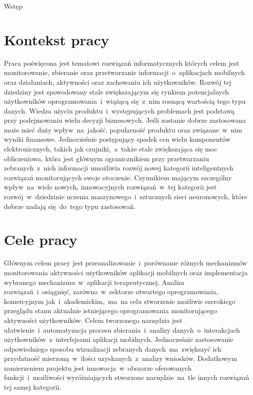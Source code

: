 \begin{chapter}{Wstęp}
	\newcommand{\chapterPath}{chapters/Introduction}

	\section{Kontekst pracy}
	Praca poświęcona jest tematowi rozwiązań informatycznych których celem jest monitorowanie, zbieranie oraz przetwarzanie informacji~o~aplikacjach mobilnych oraz działaniach, aktywności oraz zachowaniu ich użytkowników. Rozwój tej dziedziny jest spowodowany stale zwiększającym się rynkiem potencjalnych użytkowników oprogramowania~i~wiążącą się~z~nim rosnącą wartością tego typu danych. Wiedza użyciu produktu~i~występujących problemach jest podstawą przy podejmowaniu wielu decyzji biznesowych. Jeśli zostanie dobrze zastosowana może mieć duży wpływ~na~jakość, popularność produktu oraz związane~w~nim wyniki finansowe. Jednocześnie postępujący spadek cen wielu komponentów elektronicznych, takich jak czujniki,~a~także stale zwiększająca się moc obliczeniowa, która jest głównym ogranicznikiem  przy przetwarzaniu zebranych~z~nich informacji umożliwia rozwój nowej kategorii inteligentnych rozwiązań monitorujących swoje otoczenie. Czynnikiem mającym szczególny wpływ~na~wiele nowych, innowacyjnych rozwiązań~w~tej kategorii jest rozwój~w~dziedzinie uczenia maszynowego~i~sztucznych sieci neuronowych, które dobrze nadają się~do~tego typu zastosowań.
	
	\section{Cele pracy}
	Głównym celem pracy jest przeanalizowanie~i~porównanie różnych mechanizmów monitorowania aktywności użytkowników aplikacji mobilnych oraz implementacja wybranego mechanizmu~w~aplikacji terapeutycznej. Analiza rozwiązań~i~osiągnięć, zarówno~w~sektorze otwartego oprogramowania, komercyjnym jak~i~akademickim,~ma~na celu stworzenie możliwie szerokiego przeglądu stanu aktualnie istniejącego oprogramowania monitorującego aktywności użytkowników. Celem tworzonego narzędzia jest ułatwienie~i~automatyzacja procesu zbierania~i~analizy danych~o~interakcjach użytkowników~z~interfejsami aplikacji mobilnych. Jednocześnie zastosowanie odpowiedniego sposobu wizualizacji zebranych danych~ma~zwiększyć ich przydatność mierzoną~w~ilości uzyskanych~z~analizy wniosków. Dodatkowym zamierzeniem projektu jest innowacja~w~obszarze oferowanych funkcji~i~możliwości wyróżniających stworzone narzędzie~na~tle innych rozwiązań tej samej kategorii.
	

\end{chapter}
